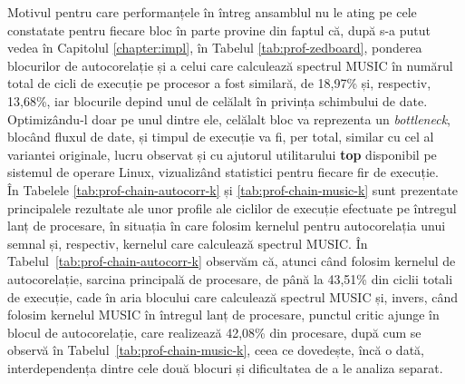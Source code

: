 Motivul pentru care performanțele în întreg ansamblul nu le ating pe cele
constatate pentru fiecare bloc în parte provine din faptul că, după s-a putut vedea în
Capitolul \ref{chapter:impl}, în Tabelul \ref{tab:prof-zedboard}, ponderea
blocurilor de autocorelație și a celui care calculează spectrul MUSIC în numărul
total de cicli de execuție pe procesor a fost similară, de 18,97\% și,
respectiv, 13,68\%, iar blocurile depind unul de celălalt în privința schimbului
de date. Optimizându-l doar pe unul dintre ele, celălalt bloc va reprezenta un
\textit{bottleneck}, blocând fluxul de date, și timpul de execuție va fi, per
total, similar cu cel al variantei originale, lucru observat și cu ajutorul
utilitarului \textbf{top} disponibil pe sistemul de operare Linux, vizualizând
statistici pentru fiecare fir de execuție. \\


În Tabelele \ref{tab:prof-chain-autocorr-k} și \ref{tab:prof-chain-music-k} sunt
prezentate principalele rezultate ale unor profile ale ciclilor de execuție
efectuate pe întregul lanț de procesare, în situația în care folosim kernelul
pentru autocorelația unui semnal și, respectiv, kernelul care calculează
spectrul MUSIC.  În Tabelul~\ref{tab:prof-chain-autocorr-k}  observăm că, atunci
când folosim kernelul de autocorelație, sarcina principală de procesare, de până
la 43,51\% din ciclii totali de execuție, cade în aria blocului care calculează
spectrul MUSIC și, invers, când folosim kernelul MUSIC în întregul lanț de
procesare, punctul critic ajunge în blocul de autocorelație, care realizează
42,08\% din procesare, după cum se observă în
Tabelul~\ref{tab:prof-chain-music-k}, ceea ce dovedește, încă o dată,
interdependența dintre cele două blocuri și dificultatea de a le analiza
separat.





%


